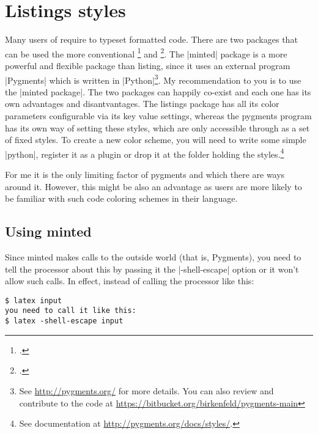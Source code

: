 \makeatletter

\thispagestyle{plain}



\chapter{Listings styles}  

Many users of \latex require to typeset formatted code. There are two packages that
can be used the more conventional \footcite{listings} and \footcite{minted}. The
|minted| package is a more powerful and flexible package than listing, since it uses
an external program |Pygments| which is written in |Python|\footnote{See \protect\url{http://pygments.org/} for more details. You can also review and contribute to the code at \protect\url{https://bitbucket.org/birkenfeld/pygments-main}}. My recommendation to you is
to use the |minted package|. The two packages can happily co-exist and each one has
its own advantages and disantvantages. The listings package has all its color
parameters configurable via its \latex key value settings, whereas the pygments program
has its own way of setting these styles, which are only accessible through \latex
as a set of fixed styles. To create a new color scheme, you will need to write some
simple |python|, register it as a plugin or drop it at the folder holding the styles.\footnote{See documentation at \protect\url{http://pygments.org/docs/styles/}.}

For me
it is the only limiting factor of pygments and which there are ways around it. However, this might be also an advantage
as users are more likely to be familiar with such code coloring schemes in their language.

\section{Using minted}

Since minted makes calls to the outside world (that is, Pygments), you need to
tell the \latex processor about this by passing it the |-shell-escape| option or it
won’t allow such calls. In effect, instead of calling the processor like this:

\begin{verbatim}
$ latex input
you need to call it like this:
$ latex -shell-escape input
\end{verbatim}

